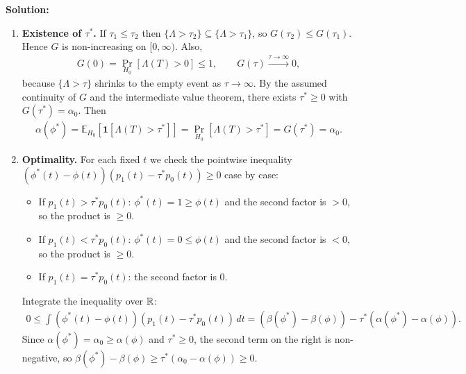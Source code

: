 \documentclass[12pt]{article}
\newcommand{\fE}{\mathbb{E}}
\begin{document}
\begin{enumerate}
\begin{solution}
{\bf Solution:}\\
\begin{enumerate}
    \item \textbf{Existence of $\tau^*$.} If $\tau_1 \le \tau_2$ then $\{\Lambda > \tau_2\} \subseteq \{\Lambda > \tau_1\}$, so $G(\tau_2) \le G(\tau_1)$. Hence $G$ is non-increasing on $[0, \infty)$. Also,
    \begin{align*}
        G(0) = \Pr_{H_0}[\Lambda(T) > 0] \le 1, \qquad G(\tau) \xrightarrow{\tau \to \infty} 0,
    \end{align*}
    because $\{\Lambda > \tau\}$ shrinks to the empty event as $\tau \to \infty$. By the assumed continuity of $G$ and the intermediate value theorem, there exists $\tau^* \ge 0$ with $G(\tau^*) = \alpha_0$. Then
    \begin{align*}
        \alpha(\phi^*) = \fE_{H_0}[\mathbf{1}[\Lambda(T) > \tau^*]] = \Pr_{H_0}[\Lambda(T) > \tau^*] = G(\tau^*) = \alpha_0.
    \end{align*}

    \item \textbf{Optimality.} For each fixed $t$ we check the pointwise inequality $(\phi^*(t) - \phi(t))(p_1(t) - \tau^* p_0(t)) \ge 0$ case by case:
    \begin{itemize}
        \item If $p_1(t) > \tau^* p_0(t)$: $\phi^*(t) = 1 \ge \phi(t)$ and the second factor is $> 0$, so the product is $\ge 0$.
        \item If $p_1(t) < \tau^* p_0(t)$: $\phi^*(t) = 0 \le \phi(t)$ and the second factor is $< 0$, so the product is $\ge 0$.
        \item If $p_1(t) = \tau^* p_0(t)$: the second factor is $0$.
    \end{itemize}
    Integrate the inequality over ${\mathbb{R}}$:
    \begin{align*}
        0 \le \int (\phi^*(t) - \phi(t))(p_1(t) - \tau^* p_0(t))\, dt = (\beta(\phi^*) - \beta(\phi)) - \tau^*(\alpha(\phi^*) - \alpha(\phi)).
    \end{align*}
    Since $\alpha(\phi^*) = \alpha_0 \ge \alpha(\phi)$ and $\tau^* \ge 0$, the second term on the right is non-negative, so $\beta(\phi^*) - \beta(\phi) \ge \tau^*(\alpha_0 - \alpha(\phi)) \ge 0$.


\end{enumerate}
\end{solution}
\end{enumerate}
\end{document}
